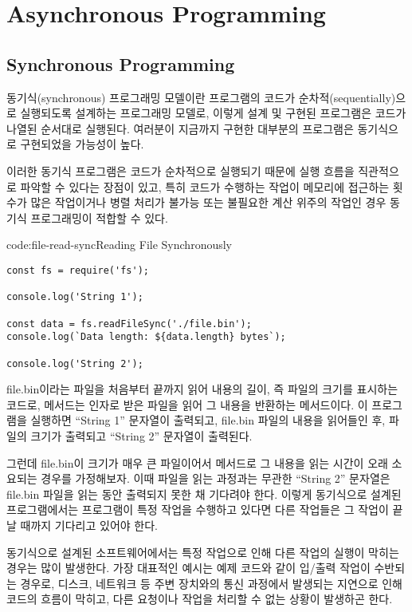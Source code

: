 \section{Asynchronous Programming}\label{sect:asynchronous-programming}

\subsection*{Synchronous Programming}

동기식(synchronous) 프로그래밍 모델이란 프로그램의 코드가 순차적(sequentially)으로 실행되도록 설계하는 프로그래밍 모델로, 이렇게 설계 및 구현된 프로그램은 코드가 나열된 순서대로 실행된다. 여러분이 지금까지 구현한 대부분의 프로그램은 동기식으로 구현되었을 가능성이 높다.

이러한 동기식 프로그램은 코드가 순차적으로 실행되기 때문에 실행 흐름을 직관적으로 파악할 수 있다는 장점이 있고, 특히 코드가 수행하는 작업이 메모리에 접근하는 횟수가 많은 작업이거나 병렬 처리가 불가능 또는 불필요한 계산 위주의 작업인 경우 동기식 프로그래밍이 적합할 수 있다.

\begin{codeenv}{code:file-read-sync}{Reading File Synchronously}\begin{verbatim}
const fs = require('fs');

console.log('String 1');

const data = fs.readFileSync('./file.bin');
console.log(`Data length: ${data.length} bytes`);

console.log('String 2');
\end{verbatim}
\end{codeenv}

\는 file.bin이라는 파일을 처음부터 끝까지 읽어 내용의 길이, 즉 파일의 크기를 표시하는 코드로,  메서드는 인자로 받은 파일을 읽어 그 내용을 반환하는 메서드이다. 이 프로그램을 실행하면 ``String 1'' 문자열이 출력되고, file.bin 파일의 내용을 읽어들인 후, 파일의 크기가 출력되고 ``String 2'' 문자열이 출력된다.

그런데 file.bin이 크기가 매우 큰 파일이어서  메서드로 그 내용을 읽는 시간이 오래 소요되는 경우를 가정해보자. 이때 파일을 읽는 과정과는 무관한 ``String 2'' 문자열은 file.bin 파일을 읽는 동안 출력되지 못한 채 기다려야 한다. 이렇게 동기식으로 설계된 프로그램에서는 프로그램이 특정 작업을 수행하고 있다면 다른 작업들은 그 작업이 끝날 때까지 기다리고 있어야 한다.

동기식으로 설계된 소프트웨어에서는 특정 작업으로 인해 다른 작업의 실행이 막히는 경우는 많이 발생한다. 가장 대표적인 예시는 예제 코드와 같이 입/출력 작업이 수반되는 경우로, 디스크, 네트워크 등 주변 장치와의 통신 과정에서 발생되는 지연으로 인해 코드의 흐름이 막히고, 다른 요청이나 작업을 처리할 수 없는 상황이 발생하곤 한다.

